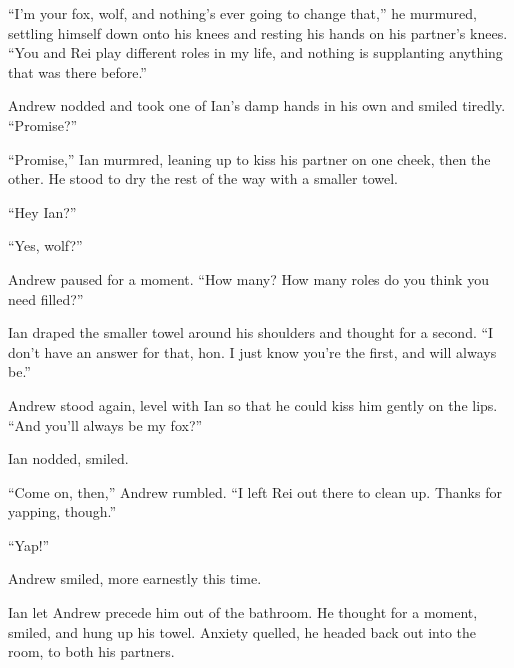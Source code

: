 ``I'm your fox, wolf, and nothing's ever going to change that,'' he murmured, settling himself down onto his knees and resting his hands on his partner's knees. ``You and Rei play different roles in my life, and nothing is supplanting anything that was there before.''

Andrew nodded and took one of Ian's damp hands in his own and smiled tiredly. ``Promise?''

``Promise,'' Ian murmred, leaning up to kiss his partner on one cheek, then the other. He stood to dry the rest of the way with a smaller towel.

``Hey Ian?''

``Yes, wolf?''

Andrew paused for a moment. ``How many? How many roles do you think you need filled?''

Ian draped the smaller towel around his shoulders and thought for a second. ``I don't have an answer for that, hon. I just know you're the first, and will always be.''

Andrew stood again, level with Ian so that he could kiss him gently on the lips. ``And you'll always be my fox?''

Ian nodded, smiled.

``Come on, then,'' Andrew rumbled. ``I left Rei out there to clean up. Thanks for yapping, though.''

``Yap!''

Andrew smiled, more earnestly this time.

Ian let Andrew precede him out of the bathroom. He thought for a moment, smiled, and hung up his towel. Anxiety quelled, he headed back out into the room, to both his partners.
